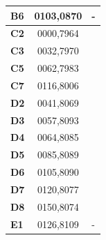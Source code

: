 \documentclass{article}
\begin{document}
\begin{CJK*}{UTF8}{bkai}
\begin{multicols}{2}
\begin{tabular}{|l|c|l|}
	\textbf{B6}&0103,0870&-\\
	\hline
	\textbf{C2}&0000,7964&\\
	\textbf{C3}&0032,7970&\\
	\textbf{C5}&0062,7983&\\
	\textbf{C7}&0116,8006&\\
	\hline
	\textbf{D2}&0041,8069&\\
	\textbf{D3}&0057,8093&\\
	\textbf{D4}&0064,8085&\\
	\textbf{D5}&0085,8089&\\
	\textbf{D6}&0105,8090&\\
	\textbf{D7}&0120,8077&\\
	\textbf{D8}&0150,8074&\\
	\hline
	\textbf{E1}&0126,8109&-\\
	\hline
\end{tabular}
\end{multicols}
\end{CJK*}
\end{document}
